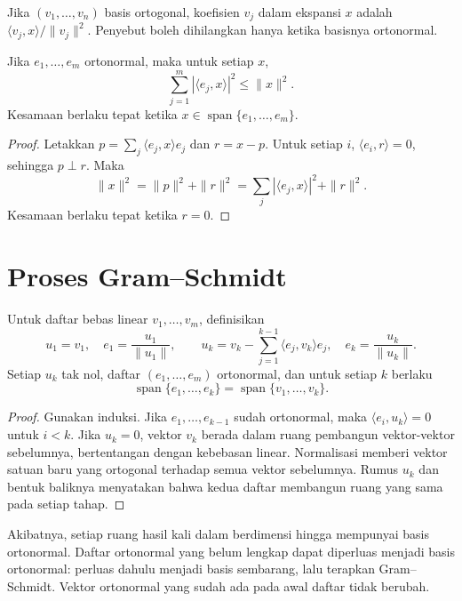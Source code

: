 Jika $(v_1,\ldots,v_n)$ basis ortogonal, koefisien $v_j$ dalam
ekspansi $x$ adalah $\langle v_j,x\rangle/\|v_j\|^2$.
Penyebut boleh dihilangkan hanya ketika basisnya ortonormal.

\begin{teorema}
    Jika $e_1,\ldots,e_m$ ortonormal, maka untuk setiap $x$,
    \[
        \sum_{j=1}^m|\langle e_j,x\rangle|^2\le\|x\|^2.
    \]
    Kesamaan berlaku tepat ketika
    $x\in\operatorname{span}\{e_1,\ldots,e_m\}$.
\end{teorema}
\begin{proof}
    Letakkan $p=\sum_j\langle e_j,x\rangle e_j$ dan $r=x-p$.
    Untuk setiap $i$, $\langle e_i,r\rangle=0$, sehingga $p\perp r$.
    Maka
    \[
        \|x\|^2=\|p\|^2+\|r\|^2
          =\sum_j|\langle e_j,x\rangle|^2+\|r\|^2.
    \]
    Kesamaan berlaku tepat ketika $r=0$.
\end{proof}

\section{Proses Gram--Schmidt}

\begin{teorema}
    Untuk daftar bebas linear $v_1,\ldots,v_m$, definisikan
    \[
        u_1=v_1,\quad e_1=\frac{u_1}{\|u_1\|},\qquad
        u_k=v_k-\sum_{j=1}^{k-1}\langle e_j,v_k\rangle e_j,
        \quad e_k=\frac{u_k}{\|u_k\|}.
    \]
    Setiap $u_k$ tak nol, daftar $(e_1,\ldots,e_m)$ ortonormal,
    dan untuk setiap $k$ berlaku
    \[
        \operatorname{span}\{e_1,\ldots,e_k\}
        =\operatorname{span}\{v_1,\ldots,v_k\}.
    \]
\end{teorema}
\begin{proof}
    Gunakan induksi. Jika $e_1,\ldots,e_{k-1}$ sudah ortonormal,
    maka $\langle e_i,u_k\rangle=0$ untuk $i<k$.
    Jika $u_k=0$, vektor $v_k$ berada dalam ruang pembangun
    vektor-vektor sebelumnya, bertentangan dengan kebebasan linear.
    Normalisasi memberi vektor satuan baru yang ortogonal
    terhadap semua vektor sebelumnya.
    Rumus $u_k$ dan bentuk baliknya menyatakan bahwa kedua
    daftar membangun ruang yang sama pada setiap tahap.
\end{proof}

Akibatnya, setiap ruang hasil kali dalam berdimensi hingga mempunyai
basis ortonormal. Daftar ortonormal yang belum lengkap dapat
diperluas menjadi basis ortonormal: perluas dahulu menjadi basis
sembarang, lalu terapkan Gram--Schmidt. Vektor ortonormal yang
sudah ada pada awal daftar tidak berubah.

